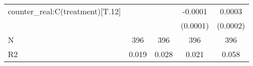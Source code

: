 \begin{table}
\begin{center}
\begin{tabular}{lcccc}
counter\_real:C(treatment)[T.12] &                    &                     & -0.0001              & 0.0003                 \\
                                 &                    &                     & (0.0001)             & (0.0002)               \\
N                                & 396                & 396                 & 396                  & 396                    \\
R2                               & 0.019              & 0.028               & 0.021                & 0.058                  \\
\hline
\end{tabular}
\end{center}
\end{table}